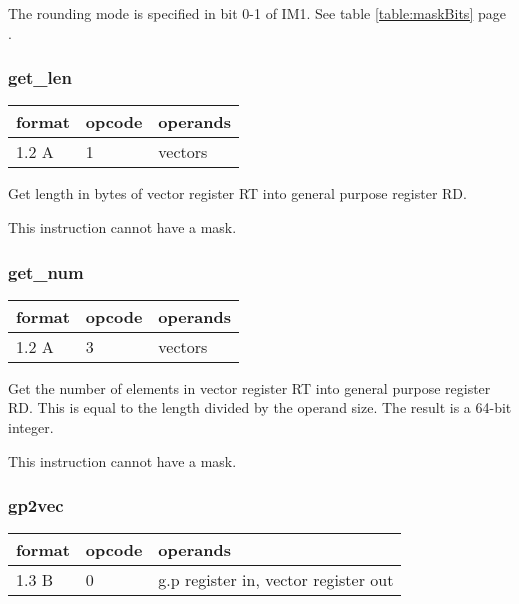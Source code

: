 \documentclass[forwardcom.tex]{subfiles}
\begin{document}
The rounding mode is specified in bit 0-1 of IM1. See table \ref{table:maskBits} page \pageref{table:maskBits}.

\subsubsection{get\_len}
\label{table:getLenInstruction}
\begin{tabular}{|p{12mm}|p{12mm}|p{110mm}|}
\hline
\bfseries format & \bfseries opcode & \bfseries operands \\ \hline
1.2 A & 1 & vectors  \\ \hline
\end{tabular}
\vspace{2mm}

Get length in bytes of vector register RT into general purpose register RD.
\vspace{2mm}

This instruction cannot have a mask.

\subsubsection{get\_num}
\label{table:getNumInstruction}
\begin{tabular}{|p{12mm}|p{12mm}|p{110mm}|}
\hline
\bfseries format & \bfseries opcode & \bfseries operands \\ \hline
1.2 A & 3 & vectors  \\ \hline
\end{tabular}
\vspace{2mm}

Get the number of elements in vector register RT into general purpose register RD. This is equal to the length divided by the operand size. The result is a 64-bit integer.
\vspace{2mm}

This instruction cannot have a mask.

\subsubsection{gp2vec}
\label{table:gp2vecInstruction}
\begin{tabular}{|p{12mm}|p{12mm}|p{110mm}|}
\hline
\bfseries format & \bfseries opcode & \bfseries operands \\ \hline
1.3 B & 0 & g.p register in, vector register out \\ \hline
\end{tabular}
\vspace{2mm}
\end{document}

